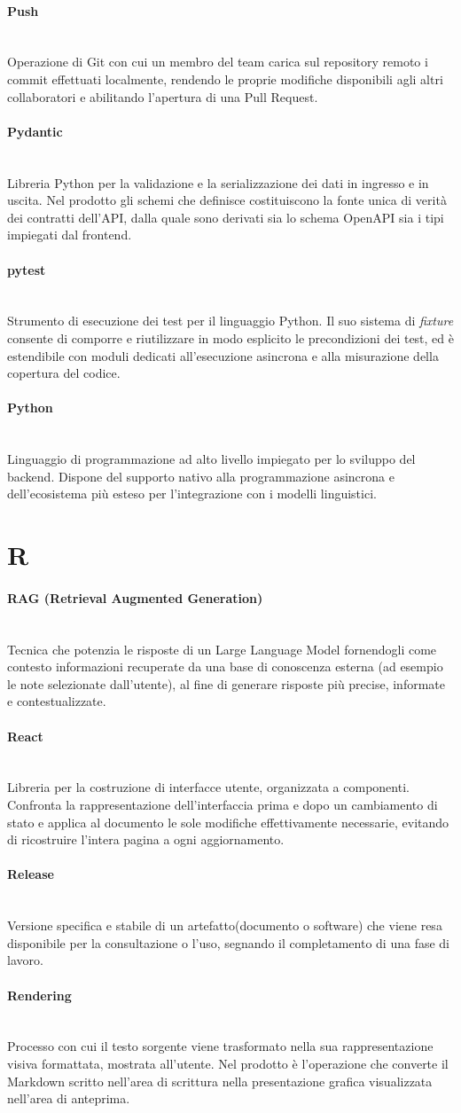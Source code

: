 \documentclass[a4paper, 10pt, colorlinks=true, linkcolor=black, urlcolor=blue, citecolor=blue, hidelinks]{article}
\newcommand{\glossaryterm}[2]{
    \paragraph{#1 \label{term:#1}} \mbox{} \\
    #2
    \vspace{0.5em}
}
\begin{document}
\glossaryterm{Push}{Operazione di Git con cui un membro del team carica sul repository remoto i commit effettuati localmente, rendendo le proprie modifiche disponibili agli altri collaboratori e abilitando l'apertura di una Pull Request.}

\glossaryterm{Pydantic}{Libreria Python per la validazione e la serializzazione dei dati in ingresso e in uscita. Nel prodotto gli schemi che definisce costituiscono la fonte unica di verità dei contratti dell'API, dalla quale sono derivati sia lo schema OpenAPI sia i tipi impiegati dal frontend.}

\glossaryterm{pytest}{Strumento di esecuzione dei test per il linguaggio Python. Il suo sistema di \textit{fixture} consente di comporre e riutilizzare in modo esplicito le precondizioni dei test, ed è estendibile con moduli dedicati all'esecuzione asincrona e alla misurazione della copertura del codice.}

\glossaryterm{Python}{Linguaggio di programmazione ad alto livello impiegato per lo sviluppo del backend. Dispone del supporto nativo alla programmazione asincrona e dell'ecosistema più esteso per l'integrazione con i modelli linguistici.}

\newpage

\section*{R}

\glossaryterm{RAG (Retrieval Augmented Generation)}{Tecnica che potenzia le risposte di un Large Language Model fornendogli come contesto informazioni recuperate da una base di conoscenza esterna (ad esempio le note selezionate dall'utente), al fine di generare risposte più precise, informate e contestualizzate.}

\glossaryterm{React}{Libreria per la costruzione di interfacce utente, organizzata a componenti. Confronta la rappresentazione dell'interfaccia prima e dopo un cambiamento di stato e applica al documento le sole modifiche effettivamente necessarie, evitando di ricostruire l'intera pagina a ogni aggiornamento.}

\glossaryterm{Release}{Versione specifica e stabile di un artefatto(documento o software) che viene resa disponibile per la consultazione o l'uso, segnando il completamento di una fase di lavoro.}

\glossaryterm{Rendering}{Processo con cui il testo sorgente viene trasformato nella sua rappresentazione visiva formattata, mostrata all'utente. Nel prodotto è l'operazione che converte il Markdown scritto nell'area di scrittura nella presentazione grafica visualizzata nell'area di anteprima.}
\end{document}
